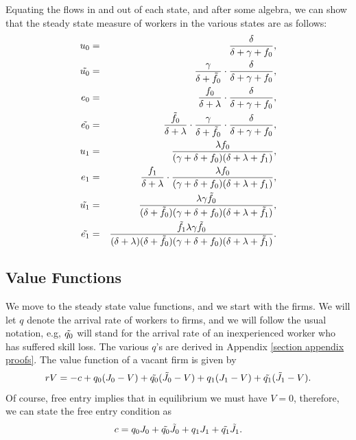 \documentclass[12pt]{article} %
\theoremstyle{definition}
\begin{document}
Equating the flows in and out of each state, and after some algebra, we can show that the steady state measure of workers in the various states are as follows:
\begin{eqnarray*}
u_0 &=& \frac{\delta}{\delta+\gamma+f_0},\nonumber   \\
\tilde{u_0} &=& \frac{\gamma}{\delta+\Tilde{f_0}} \cdot  \frac{\delta}{\delta+\gamma+f_0}, \nonumber  \\
e_0 &=& \frac{f_0}{\delta+\lambda} \cdot \frac{\delta}{\delta+\gamma+f_0}, \nonumber\\
\Tilde{e_0} &=& \frac{\Tilde{f_0}}{\delta+\lambda} \cdot \frac{\gamma}{\delta + \Tilde{f_0}} \cdot \frac{\delta}{\delta+\gamma+f_0}, \nonumber  \\
 u_1 &=& \frac{\lambda f_0}{(\gamma+\delta+f_0)(\delta+\lambda+f_1)}, \nonumber \\
 e_1 &=& \frac{f_1}{\delta+\lambda} \cdot \frac{\lambda f_0}{(\gamma+\delta+f_0)(\delta+\lambda+f_1)}, \nonumber \\
 \Tilde{u_1} &=& \frac{\lambda \gamma \Tilde{f_0}}{(\delta+\Tilde{f_0})(\gamma+\delta+f_0)(\delta+\lambda+\Tilde{f_1})}, \nonumber \\
 \Tilde{e_1} &=& \frac{\Tilde{f_1}\lambda \gamma \Tilde{f_0}}{(\delta+\lambda)(\delta+\Tilde{f_0})(\gamma+\delta+f_0)(\delta+\lambda+\Tilde{f_1})}. \nonumber 
 \end{eqnarray*}


\subsection{Value Functions}\label{section value functions}
We move to the steady state value functions, and we start with the firms. We will let $q$ denote the arrival rate of workers to firms, and we will follow the usual notation, e.g, $\Tilde{q_0}$ will stand for the arrival rate of an inexperienced worker who has suffered skill loss. The various $q$'s are derived in Appendix \ref{section appendix proofs}. The value function of a vacant firm is given by 
\begin{equation}
   rV = -c + q_0 (J_0-V) + \Tilde{q_0}(\Tilde{J_0}-V) + q_1 (J_1-V) + \Tilde{q_1}(\Tilde{J_1}-V).\nonumber 
\end{equation}Of course, free entry implies that in equilibrium we must have $V=0$, therefore, we can state the free entry condition as 
\begin{equation}
   c= q_0 J_0 + \Tilde{q_0}\Tilde{J_0} + q_1 J_1 + \Tilde{q_1}\Tilde{J_1}.\label{eq free entry} 
\end{equation}
\end{document}
